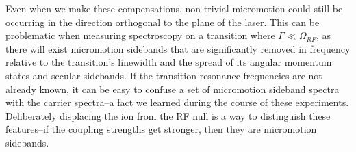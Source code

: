 Even when we make these compensations, non-trivial micromotion could still be occurring in the direction orthogonal to the plane of the laser. This can be problematic when measuring spectroscopy on a transition where $\Gamma \ll \Omega_{RF}$, as there will exist micromotion sidebands that are significantly removed in frequency relative to the transition's linewidth and the spread of its angular momentum states and secular sidebands. If the transition resonance frequencies are not already known, it can be easy to confuse a set of micromotion sideband spectra with the carrier spectra--a fact we learned during the course of these experiments. Deliberately displacing the ion from the RF null is a way to distinguish these features--if the coupling strengths get stronger, then they are micromotion sidebands. 
